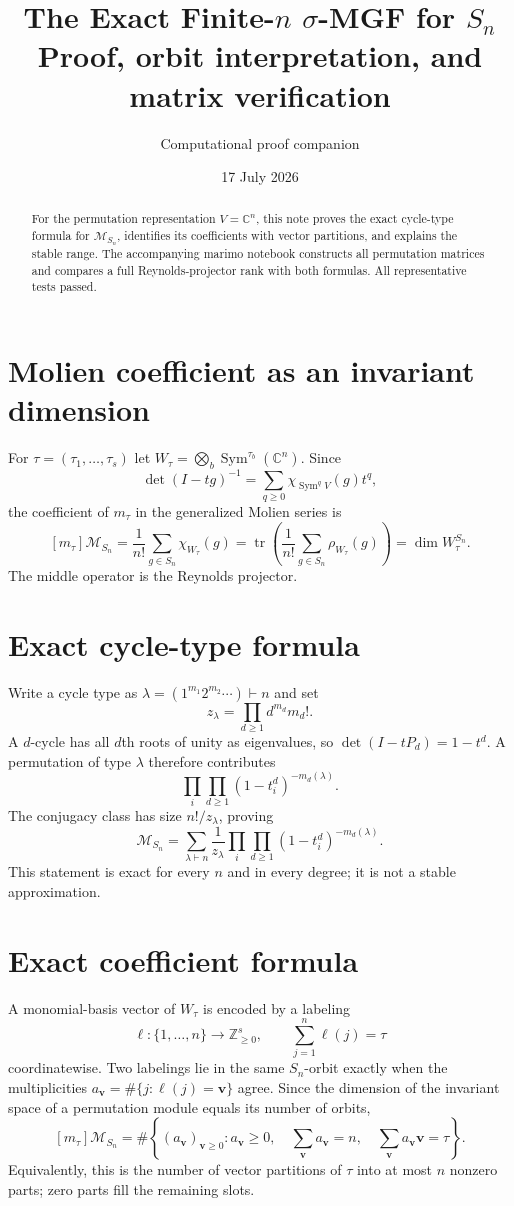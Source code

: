 \documentclass[10pt]{article}
\title{\color{navy}\textbf{The Exact Finite-$n$ $\sigma$-MGF for $S_n$}\\[2mm]
\large Proof, orbit interpretation, and matrix verification}
\author{Computational proof companion}
\date{17 July 2026}
\newcommand{\Sym}{\operatorname{Sym}}
\newcommand{\M}{\mathcal M}
\begin{document}
\maketitle
\begin{abstract}
For the permutation representation $V=\mathbb C^n$, this note proves the exact
cycle-type formula for $\M_{S_n}$, identifies its coefficients with vector
partitions, and explains the stable range.  The accompanying marimo notebook
constructs all permutation matrices and compares a full Reynolds-projector
rank with both formulas.  All representative tests passed.
\end{abstract}

\section{Molien coefficient as an invariant dimension}
For $\tau=(\tau_1,\ldots,\tau_s)$ let
$W_\tau=\bigotimes_b\Sym^{\tau_b}(\mathbb C^n)$.  Since
\[
 \det(I-tg)^{-1}=\sum_{q\ge0}\chi_{\Sym^qV}(g)t^q,
\]
the coefficient of $m_\tau$ in the generalized Molien series is
\[
 [m_\tau]\M_{S_n}=\frac1{n!}\sum_{g\in S_n}\chi_{W_\tau}(g)
 =\operatorname{tr}\left(\frac1{n!}\sum_{g\in S_n}\rho_{W_\tau}(g)\right)
 =\dim W_\tau^{S_n}.
\]
The middle operator is the Reynolds projector.

\section{Exact cycle-type formula}
Write a cycle type as $\lambda=(1^{m_1}2^{m_2}\cdots)\vdash n$ and set
\[
 z_\lambda=\prod_{d\ge1}d^{m_d}m_d!.
\]
A $d$-cycle has all $d$th roots of unity as eigenvalues, so
$\det(I-tP_d)=1-t^d$.  A permutation of type $\lambda$ therefore contributes
\[
 \prod_i\prod_{d\ge1}(1-t_i^d)^{-m_d(\lambda)}.
\]
The conjugacy class has size $n!/z_\lambda$, proving
\[
 \boxed{\M_{S_n}=\sum_{\lambda\vdash n}\frac1{z_\lambda}
 \prod_i\prod_{d\ge1}(1-t_i^d)^{-m_d(\lambda)}.}
\]
This statement is exact for every $n$ and in every degree; it is not a stable
approximation.

\section{Exact coefficient formula}
A monomial-basis vector of $W_\tau$ is encoded by a labeling
\[
 \ell:\{1,\ldots,n\}\longrightarrow\mathbb Z_{\ge0}^s,
 \qquad \sum_{j=1}^n\ell(j)=\tau
\]
coordinatewise.  Two labelings lie in the same $S_n$-orbit exactly when the
multiplicities
$a_{\mathbf v}=\#\{j:\ell(j)=\mathbf v\}$ agree.  Since the dimension of the
invariant space of a permutation module equals its number of orbits,
\[
 \boxed{[m_\tau]\M_{S_n}=\#\left\{(a_{\mathbf v})_{\mathbf v\ge0}:
 a_{\mathbf v}\ge0,\quad \sum_{\mathbf v}a_{\mathbf v}=n,\quad
 \sum_{\mathbf v}a_{\mathbf v}\mathbf v=\tau\right\}.}
\]
Equivalently, this is the number of vector partitions of $\tau$ into at most
$n$ nonzero parts; zero parts fill the remaining slots.
\end{document}
